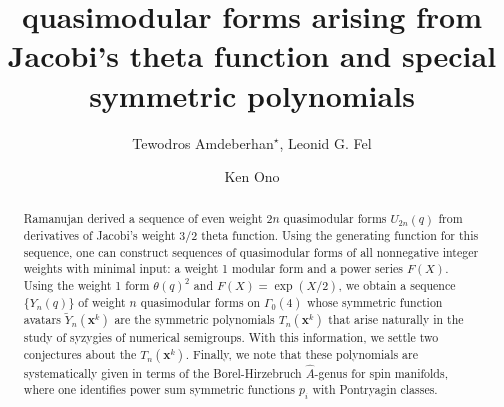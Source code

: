 \documentclass[11pt]{amsart}
\title[Quasimodular forms and symmetric polynomials]{quasimodular forms arising from Jacobi's theta function and special symmetric polynomials}
\author{Tewodros Amdeberhan$^{\star}$, Leonid G. Fel \and Ken Ono}
\theoremstyle{definition}
\theoremstyle{remark}
\numberwithin{equation}{section}
\begin{document}
\maketitle


\begin{abstract} Ramanujan derived a sequence of even weight $2n$ quasimodular forms $U_{2n}(q)$ from derivatives of Jacobi's weight $3/2$ theta function. Using the generating function for this sequence, one can construct sequences of quasimodular forms of all nonnegative integer weights with minimal input: a weight 1 modular form and a power series $F(X)$. Using the weight 1 form $\theta(q)^2$ and $F(X)=\exp(X/2)$, we obtain a sequence $\{Y_n(q)\}$ of weight $n$ quasimodular forms on $\Gamma_0(4)$ whose symmetric function avatars $\widetilde{Y}_n(\pmb{x}^k)$ are the symmetric polynomials $T_n(\pmb{x}^k)$ that arise naturally in the study of syzygies of numerical semigroups. 
With this information,  we settle two conjectures  about the $T_n(\pmb{x}^k).$ Finally, we note that these polynomials are systematically given in terms of the Borel-Hirzebruch $\widehat{A}$-genus for spin manifolds, where one identifies power sum symmetric functions $p_i$ with Pontryagin classes. 
\end{abstract}
\end{document}

